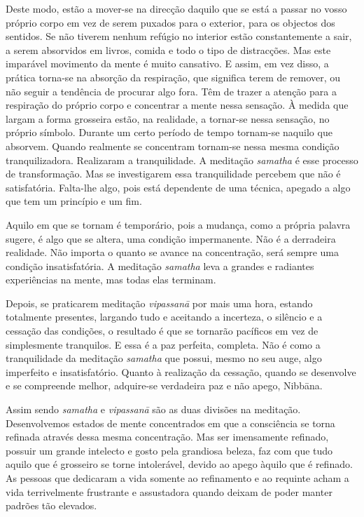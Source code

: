 Deste modo, estão a mover-se na direcção daquilo que se está a passar no vosso
próprio corpo em vez de serem puxados para o exterior, para os objectos dos
sentidos. Se não tiverem nenhum refúgio no interior estão constantemente a sair,
a serem absorvidos em livros, comida e todo o tipo de distracções. Mas este
imparável movimento da mente é muito cansativo. E assim, em vez disso, a prática
torna-se na absorção da respiração, que significa terem de remover, ou não
seguir a tendência de procurar algo fora. Têm de trazer a atenção para a
respiração do próprio corpo e concentrar a mente nessa sensação. À medida que
largam a forma grosseira estão, na realidade, a tornar-se nessa sensação, no
próprio símbolo. Durante um certo período de tempo tornam-se naquilo que
absorvem. Quando realmente se concentram tornam-se nessa mesma condição
tranquilizadora. Realizaram a tranquilidade. A meditação \emph{samatha} é esse
processo de transformação. Mas se investigarem essa tranquilidade percebem que
não é satisfatória. Falta-lhe algo, pois está dependente de uma técnica, apegado
a algo que tem um princípio e um fim.

Aquilo em que se tornam é temporário, pois a mudança, como a própria palavra
sugere, é algo que se altera, uma condição impermanente. Não é a derradeira
realidade. Não importa o quanto se avance na concentração, será sempre uma
condição insatisfatória. A meditação \emph{samatha} leva a grandes e radiantes
experiências na mente, mas todas elas terminam.

Depois, se praticarem meditação \emph{vipassanā} por mais uma hora, estando
totalmente presentes, largando tudo e aceitando a incerteza, o silêncio e a
cessação das condições, o resultado é que se tornarão pacíficos em vez de
simplesmente tranquilos. E essa é a paz perfeita, completa. Não é como a
tranquilidade da meditação \emph{samatha} que possui, mesmo no seu auge, algo
imperfeito e insatisfatório. Quanto à realização da cessação, quando se
desenvolve e se compreende melhor, adquire-se verdadeira paz e não apego,
Nibbāna.

Assim sendo \emph{samatha} e \emph{vipassanā} são as duas divisões na meditação.
Desenvolvemos estados de mente concentrados em que a consciência se torna
refinada através dessa mesma concentração. Mas ser imensamente refinado, possuir
um grande intelecto e gosto pela grandiosa beleza, faz com que tudo aquilo que é
grosseiro se torne intolerável, devido ao apego àquilo que é refinado. As
pessoas que dedicaram a vida somente ao refinamento e ao requinte acham a vida
terrivelmente frustrante e assustadora quando deixam de poder manter padrões tão
elevados.

